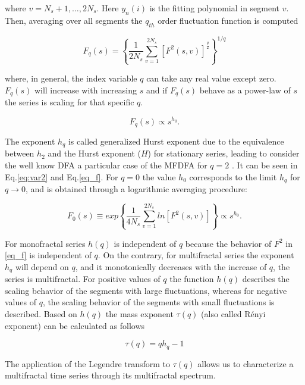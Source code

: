 \documentclass[onecolumn, preprint,aps,amsmath, amssymb, superscriptaddress]{revtex4}
\begin{document}
where $v=N_s+1,\ldots,2N_s$. Here $y_n (i)$  is the fitting polynomial in segment $v$. \\
Then, averaging over all segments the $q_{th}$ order fluctuation function is computed

\begin{equation}
F_q (s)=\left\lbrace \frac{1}{2N_s} \sum_{v=1}^{2N_s}[F^2 (s,v)]^{\frac{q}{2}}\right\rbrace ^{1/q}
\label{eq_f}  
\end{equation}

where, in general, the index variable $q$ can take any real value except zero. $F_q (s)$ will increase with increasing $s$ and if $F_q (s)$  behave as a power-law of $s$ the series is scaling for that specific $q$.


\begin{equation}
F_q (s) \propto s^{h_q}.
\end{equation}

The exponent $h_q$ is called generalized Hurst exponent due to the equivalence between $h_2$ and the Hurst exponent ($H$) for stationary series, leading to consider the well know DFA \cite{Peng} a particular case of the MFDFA for $q=2$ \cite{Kantelhardt_2, Zhang}. It can be seen  in Eq.\ref{eq:var2} and Eq.\ref{eq_f}. For $q=0$ the value $h_0$ corresponds to the limit $h_q$ for $q \rightarrow 0$, and is obtained through a logarithmic averaging procedure:

\begin{equation}
F_0(s) \equiv exp \left\lbrace \frac{1}{4N_s} \sum_{v=1}^{2N_s} ln[F^2 (s,v)]\right\rbrace  \propto s^{h_0}.
\end{equation}

For monofractal series $h(q)$ is independent of $q$ because the behavior of $F^2$ in \ref{eq_f} is independent of $q$. On the contrary, for multifractal series the exponent $h_q$ will depend on $q$, and it monotonically decreases with the increase of $q$, the series is multifractal. For positive values of $q$ the function $h(q)$ describes the scaling behavior of the segments with large fluctuations, whereas for negative values of $q$, the scaling behavior of the segments with small fluctuations is described. Based on $h(q)$ the mass exponent $\tau(q)$ (also called R\'enyi exponent) can be calculated as follows

\begin{equation}
\tau(q)=qh_q-1
\label{eq:Reny}
\end{equation}

The application of the Legendre transform to $\tau(q)$ allows us to characterize a multifractal time series through its multifractal spectrum.
\end{document}
